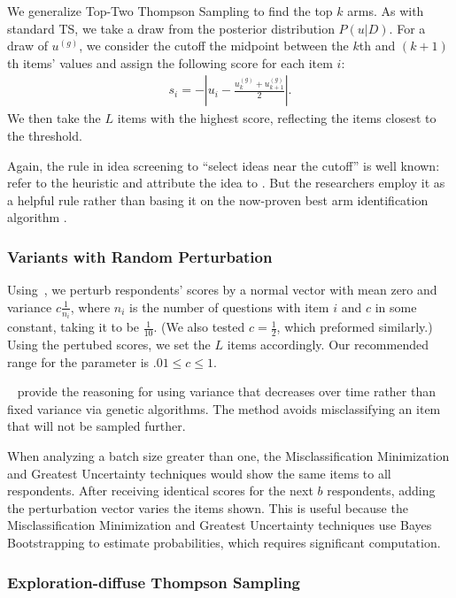 \documentclass[nonblindrev]{informs3}
\newcommand{\numperset}{L}
\begin{document}
We generalize Top-Two Thompson Sampling to find the top $k$ arms. As with standard TS, we take a draw from the posterior distribution $P(u|D)$. For a draw of $u^{(g)}$, we consider the cutoff the midpoint between the $k$th and $(k+1)$th items' values and assign the following score for each item $i$:
\begin{align}
s_i= - | u_i - \frac{u_k^{(g)} +u_{k+1}^{(g)} }{2}|.
\end{align} 
We then take the $\numperset$ items with the highest score, reflecting the items closest to the threshold. 

Again, the rule in idea screening to ``select ideas near the cutoff'' is well known: \cite{toubia2007adaptive} refer to the heuristic and attribute the idea to \cite{bradlow1998some}. But the researchers employ it as a helpful rule rather than basing it on the now-proven best arm identification algorithm \citep{russo2016simple}.

\subsubsection{Variants with Random Perturbation}

Using~\cite{toubia2007adaptive},  we perturb respondents' scores by a normal vector with mean zero and variance $c\frac{1}{n_i}$, where $n_i$ is the number of questions with item $i$ and $c$ in some constant, taking it to be $\frac{1}{10}$. (We also tested $c=\frac{1}{2}$, which preformed similarly.) Using the pertubed scores, we set the $\numperset$ items accordingly. Our recommended range for the parameter is $.01 \leq c \leq 1$.

~\cite{toubia2007adaptive} provide the reasoning for using variance that decreases over time rather than fixed variance via genetic algorithms. The method avoids misclassifying an item that will not be sampled further.

When analyzing a batch size greater than one, the Misclassification Minimization and Greatest Uncertainty techniques would show the same items to all respondents. After receiving identical scores for the next $b$ respondents, adding the perturbation vector varies the items shown. This is useful because the Misclassification Minimization and Greatest Uncertainty techniques use Bayes Bootstrapping to estimate probabilities, which requires significant computation.

\subsubsection{Exploration-diffuse Thompson Sampling} \label{sec:edts}
\end{document}
